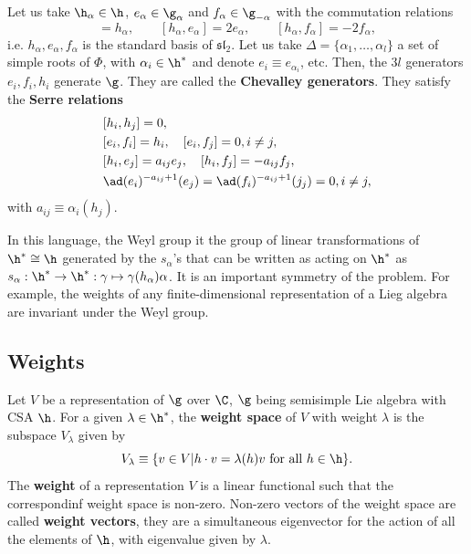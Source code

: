 \documentclass{worksheetclass}
\renewcommand{\emph}{\textbf}
\begin{document}
        Let us take $\h_\alpha\in\h$, $e_\alpha\in\g_\alpha$ and $f_\alpha\in\g_{-\alpha}$ with the commutation relations
        \begin{equation}
            [e_\alpha,f_\alpha]=h_\alpha,\qquad [h_\alpha,e_\alpha]=2e_\alpha,\qquad [h_\alpha,f_\alpha]=-2f_\alpha,
        \end{equation}
        i.e. $h_\alpha,e_\alpha,f_\alpha$ is the standard basis of $\mathfrak{sl}_2$. Let us take $\Delta=\{\alpha_1,\dots,\alpha_l\}$ a set of simple roots of $\Phi$, with $\alpha_i\in\h^*$ and denote $e_i\equiv e_{\alpha_i}$, etc. Then, the $3l$ generators $e_i,f_i,h_i$ generate $\g$. They are called the \emph{Chevalley generators}. They satisfy the \emph{Serre relations}
        \begin{align}
            &[h_i,h_j] = 0,\\
            &[e_i,f_i] = h_i,\quad [e_i,f_j]=0, i\neq j,\\
            &[h_i,e_j] = a_{ij}e_j,\quad [h_i,f_j]=-a_{ij}f_j,\\
            &\ad(e_i)^{-a_{ij}+1}(e_j) = \ad(f_i)^{-a_{ij}+1}(j_j)=0,i\neq j,
        \end{align}
        with $a_{ij}\equiv\alpha_i(h_j)$.

        In this language, the Weyl group it the group of linear transformations of $\h^*\cong\h$ generated by the $s_\alpha$'s that can be written as acting on $\h^*$ as $s_\alpha:\h^*\to\h^*:\gamma\mapsto\gamma(h_\alpha)\alpha$. It is an important symmetry of the problem. For example, the weights of any finite-dimensional representation of a Lieg algebra are invariant under the Weyl group.

    \subsection{Weights}

        Let $V$ be a representation of $\g$ over $\C$, $\g$ being semisimple Lie algebra with CSA $\h$. For a given $\lambda\in\h^*$, the \emph{weight space} of $V$ with weight $\lambda$ is the subspace $V_\lambda$ given by
        \begin{equation}
            V_\lambda\equiv \{v\in V| h\cdot v =\lambda(h)v\text{ for all }h\in\h\}.
        \end{equation}
        The \emph{weight} of a representation $V$ is a linear functional such that the correspondinf weight space is non-zero. Non-zero vectors of the weight space are called \emph{weight vectors}, they are a simultaneous eigenvector for the action of all the elements of $\h$, with eigenvalue given by $\lambda$. 

\printbibliography
\end{document}
